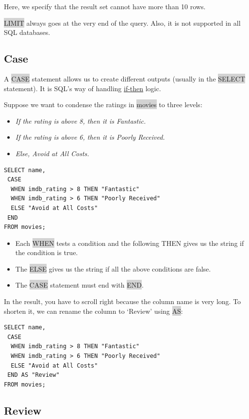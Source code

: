 \documentclass[11pt]{article}
\begin{document}
{{Here, we specify that the result set cannot have more than 10 rows.

\colorbox{lightgray}{LIMIT} always goes at the very end of the query. Also, it is not supported in all SQL databases.

\subsection{Case}
A \colorbox{lightgray}{CASE} statement allows us to create different outputs (usually in the \colorbox{lightgray}{SELECT} statement). It is SQL’s way of handling \href{https://en.wikipedia.org/wiki/Conditional_(computer_programming)}{if-then} logic.

Suppose we want to condense the ratings in \colorbox{lightgray}{movies} to three levels:
\begin{itemize}[leftmargin = *]
\item \textit{If the rating is above 8, then it is Fantastic.}
\item \textit{If the rating is above 6, then it is Poorly Received.}
\item \textit{Else, Avoid at All Costs.}
\end{itemize}
\begin{lstlisting}
SELECT name,
 CASE
  WHEN imdb_rating > 8 THEN "Fantastic"
  WHEN imdb_rating > 6 THEN "Poorly Received"
  ELSE "Avoid at All Costs"
 END
FROM movies;
\end{lstlisting}
\begin{itemize}[leftmargin = *]
\item Each \colorbox{lightgray}{WHEN} tests a condition and the following THEN gives us the string if the condition is true.
\item The \colorbox{lightgray}{ELSE} gives us the string if all the above conditions are false.
\item The \colorbox{lightgray}{CASE} statement must end with \colorbox{lightgray}{END}.
\end{itemize}
In the result, you have to scroll right because the column name is very long. To shorten it, we can rename the column to ‘Review’ using \colorbox{lightgray}{AS}:
\begin{lstlisting}
SELECT name,
 CASE
  WHEN imdb_rating > 8 THEN "Fantastic"
  WHEN imdb_rating > 6 THEN "Poorly Received"
  ELSE "Avoid at All Costs"
 END AS "Review"
FROM movies;
\end{lstlisting}

\subsection{Review}

}}
\end{document}
